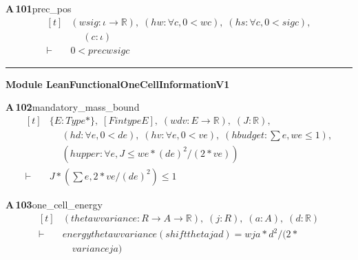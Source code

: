 \documentclass[conference]{IEEEtran}
\theoremstyle{definition}
\newcommand{\lean}[1]{\textsf{\footnotesize #1}}
\begin{document}
\noindent\textbf{A\,101}\quad\lean{prec\_pos}
{\footnotesize\[ \begin{aligned}[t]
&(\mathit{w} \mathit{sig} : \iota \to \mathbb{R} ),\; (\mathit{hw} : \forall \mathit{c}, 0 < \mathit{w} \mathit{c}),\; (\mathit{hs} : \forall \mathit{c}, 0 < \mathit{sig} \mathit{c}),\\
&\quad \; (\mathit{c} : \iota )\\
\vdash\;&0 < \mathit{prec} \mathit{w} \mathit{sig} \mathit{c}
\end{aligned} \]}

\vspace{4pt}\noindent\rule{\columnwidth}{0.4pt}\par\vspace{2pt}
\noindent\textbf{Module \lean{LeanFunctionalOneCellInformationV1}}\par\vspace{3pt}

\noindent\textbf{A\,102}\quad\lean{mandatory\_mass\_bound}
{\footnotesize\[ \begin{aligned}[t]
&\{ \mathit{E} : \mathit{Type}*\},\; [\mathit{Fintype} \mathit{E}],\; (\mathit{w} \mathit{d} \mathit{v} : \mathit{E} \to \mathbb{R} ),\; (\mathit{J} : \mathbb{R} ),\\
&\quad \; (\mathit{hd} : \forall \mathit{e},0 < \mathit{d} \mathit{e}),\; (\mathit{hv} : \forall \mathit{e},0 < \mathit{v} \mathit{e}),\; (\mathit{hbudget} : \textstyle\sum \mathit{e},\mathit{w} \mathit{e} \leq 1),\\
&\quad \; (\mathit{hupper} : \forall \mathit{e},\mathit{J} \leq \mathit{w} \mathit{e}*(\mathit{d} \mathit{e})^{2}/(2*\mathit{v} \mathit{e}))\\
\vdash\;&\mathit{J}*(\textstyle\sum \mathit{e},2*\mathit{v} \mathit{e}/(\mathit{d} \mathit{e})^{2}) \leq 1
\end{aligned} \]}

\noindent\textbf{A\,103}\quad\lean{one\_cell\_energy}
{\footnotesize\[ \begin{aligned}[t]
&(\mathit{theta} \mathit{w} \mathit{variance} : \mathit{R} \to \mathit{A} \to \mathbb{R} ),\; (\mathit{j} : \mathit{R}),\; (\mathit{a} : \mathit{A}),\; (\mathit{d} : \mathbb{R} )\\
\vdash\;&\mathit{energy} \mathit{theta} \mathit{w} \mathit{variance} (\mathit{shift} \mathit{theta} \mathit{j} \mathit{a} \mathit{d}) = \mathit{w} \mathit{j} \mathit{a}*\mathit{d}^{2}/(2*\\
&\quad \mathit{variance} \mathit{j} \mathit{a})
\end{aligned} \]}
\end{document}
